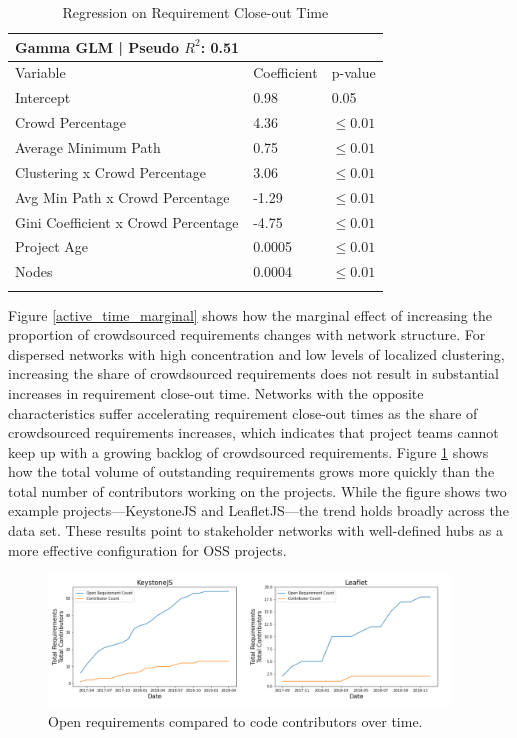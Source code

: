 \begin{table}
\caption{Regression on Requirement Close-out Time}
\label{active_time_regression}
\begin{tabular}{lll}
Gamma GLM | Pseudo $R^2$: 0.51 \\
\hline\noalign{\smallskip}
Variable & Coefficient & p-value  \\
\noalign{\smallskip}\hline\noalign{\smallskip}
Intercept & 0.98 & 0.05 \\
Crowd Percentage & 4.36 & $\leq 0.01$  \\
Average Minimum Path & 0.75 & $\leq 0.01$ \\
Clustering x Crowd Percentage & 3.06 & $\leq 0.01$ \\
Avg Min Path x Crowd Percentage & -1.29 & $\leq 0.01$ \\
Gini Coefficient x Crowd Percentage & -4.75 & $\leq 0.01$ \\
Project Age & 0.0005 & $\leq 0.01$ \\
Nodes & 0.0004 & $\leq 0.01$ \\
\noalign{\smallskip}\hline
\end{tabular}
\end{table}

Figure \ref{active_time_marginal} shows how the marginal effect of increasing the proportion of crowdsourced requirements changes with network structure. For dispersed networks with high concentration and low levels of localized clustering, increasing the share of crowdsourced requirements does not result in substantial increases in requirement close-out time. Networks with the opposite characteristics suffer accelerating requirement close-out times as the share of crowdsourced requirements increases, which indicates that project teams cannot keep up with a growing backlog of crowdsourced requirements. Figure \ref{reqs_contributors_over_time} shows how the total volume of outstanding requirements grows more quickly than the total number of contributors working on the projects. While the figure shows two example projects---KeystoneJS and LeafletJS---the trend holds broadly across the data set. These results point to stakeholder networks with well-defined hubs as a more effective configuration for OSS projects.

\begin{figure}
  \includegraphics[width=0.95\textwidth]{reqs_contributors_over_time.PNG}
\caption{Open requirements compared to code contributors over time.}
\label{reqs_contributors_over_time}
\end{figure}

